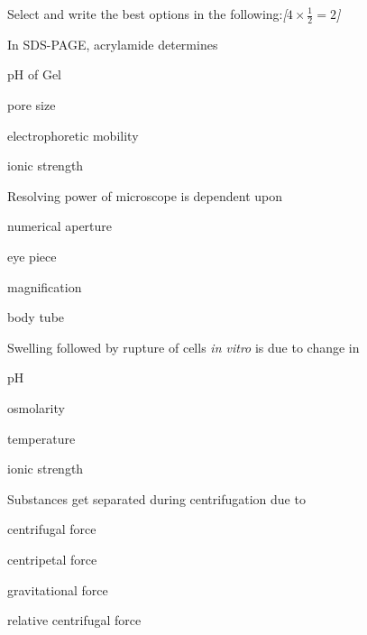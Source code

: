 \documentclass[11pt,a4paper]{article}
\newcommand{\pts}[1]{\hfill   \textit{[#1]}}
\begin{document}
\begin{parts}
  \item Select and write the best options in the following:\pts{$4  \times \frac{1}{2} = 2$}
  
\begin{parts}
    \item In SDS-PAGE, acrylamide determines
    
\begin{parts}
      \item pH of Gel
      \item pore size
      \item electrophoretic mobility
      \item ionic strength
    \end{parts}

    \item Resolving power of microscope is dependent upon
    
\begin{parts}
      \item numerical aperture
      \item eye piece
      \item magnification
      \item body tube
    \end{parts}

    \item Swelling followed by rupture of cells   \textit{in vitro} is due to change in
    
\begin{parts}
      \item pH
      \item osmolarity
      \item temperature
      \item ionic strength
    \end{parts}

    \item Substances get separated during centrifugation due to
    
\begin{parts}
      \item centrifugal force
      \item centripetal force
      \item gravitational force
      \item relative centrifugal force
    \end{parts}
  \end{parts}


\end{parts}
\end{document}
